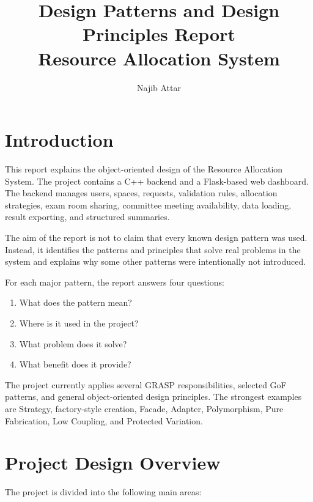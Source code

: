\documentclass[12pt,a4paper]{article}
\title{
    \textbf{\color{TitleBlue}Design Patterns and Design Principles Report}\\[0.4em]
    \large Resource Allocation System
}
\author{Najib Attar}
\date{}
\begin{document}
\maketitle
\tableofcontents
\newpage

\section{Introduction}

This report explains the object-oriented design of the Resource Allocation
System. The project contains a C++ backend and a Flask-based web dashboard.
The backend manages users, spaces, requests, validation rules, allocation
strategies, exam room sharing, committee meeting availability, data loading,
result exporting, and structured summaries.

The aim of the report is not to claim that every known design pattern was
used. Instead, it identifies the patterns and principles that solve real
problems in the system and explains why some other patterns were intentionally
not introduced.

For each major pattern, the report answers four questions:

\begin{enumerate}
    \item What does the pattern mean?
    \item Where is it used in the project?
    \item What problem does it solve?
    \item What benefit does it provide?
\end{enumerate}

The project currently applies several GRASP responsibilities, selected GoF
patterns, and general object-oriented design principles. The strongest examples
are Strategy, factory-style creation, Facade, Adapter, Polymorphism,
Pure Fabrication, Low Coupling, and Protected Variation.

\section{Project Design Overview}

The project is divided into the following main areas:
\end{document}
